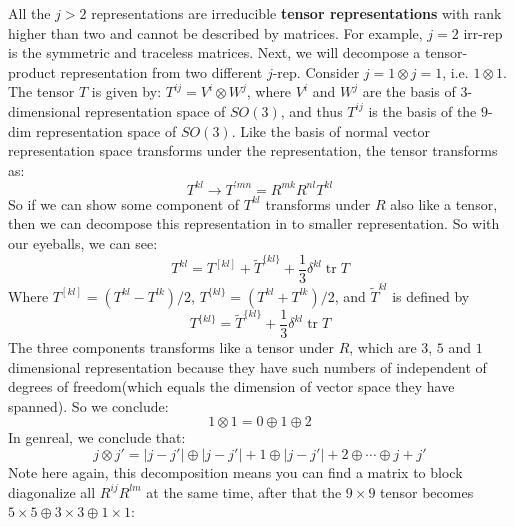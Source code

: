 \documentclass{article}
\begin{document}
	All the $j >2$ representations are irreducible \textbf{tensor representations} with rank higher than two and cannot be described by matrices. For example, $j=2$ irr-rep is the symmetric and traceless matrices. Next, we will decompose a tensor-product representation from two different $j$-rep. Consider $j=1\otimes j=1$, i.e. $1\otimes 1$. The tensor $T$ is given by: $T^{ij} =V^{i} \otimes W^{j}$, where $V^{i}$ and $W^{j}$ are the basis of 3-dimensional representation space of $SO( 3)$, and thus $T^{ij}$ is the basis of the $9$-dim representation space of $SO( 3)$. Like the basis of normal vector representation space transforms under the representation, the tensor transforms as:
	\begin{equation*}
		T^{kl}\rightarrow T^{\prime mn} =R^{mk} R^{nl} T^{kl}
	\end{equation*}
	So if we can show some component of $T^{kl}$ transforms under $R$ also like a tensor, then we can decompose this representation in to smaller representation. So with our eyeballs, we can see:
	\begin{equation*}
		T^{kl} =T^{[ kl]} +\tilde{T}^{\{kl\}} +\frac{1}{3} \delta ^{kl}\operatorname{tr} T
	\end{equation*}
	Where $T^{[ kl]} =\left( T^{kl} -T^{lk}\right) /2$, $T^{\{kl\}} =\left( T^{kl} +T^{lk}\right) /2$, and $\tilde{T}^{kl}$ is defined by
	\begin{equation*}
		T^{\{kl\}} =\tilde{T}^{\{kl\}} +\frac{1}{3} \delta ^{kl}\operatorname{tr} T
	\end{equation*}
	The three components transforms like a tensor under $R$, which are $3$, $5$ and $1$ dimensional representation because they have such numbers of independent of degrees of freedom(which equals the dimension of vector space they have spanned). So we conclude:
	\begin{equation*}
		1\otimes 1=0\oplus 1\oplus 2
	\end{equation*}
	In genreal, we conclude that:
	\begin{equation*}
		j\otimes j'=| j-j'| \oplus | j-j'| +1\oplus | j-j'| +2\oplus \cdots \oplus j+j'
	\end{equation*}
	Note here again, this decomposition means you can find a matrix to block diagonalize all $R^{ij} R^{lm}$ at the same time, after that the $9\times 9$ tensor becomes $5\times 5\oplus 3\times 3\oplus 1\times 1$:
\end{document}

